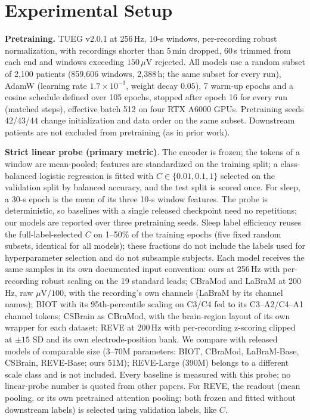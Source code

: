 \section{Experimental Setup}\label{sec:setup}
\noindent\textbf{Pretraining.} TUEG v2.0.1 at 256\,Hz, 10-s windows, per-recording robust
normalization, with recordings shorter than 5\,min dropped, 60\,s trimmed from each end and
windows exceeding $150\,\mu$V rejected. All models use a random subset of 2{,}100 patients
(859{,}606 windows, 2{,}388\,h; the same subset for every run), AdamW (learning rate
$1.7{\times}10^{-3}$, weight decay $0.05$), 7 warm-up epochs and a cosine schedule defined
over 105 epochs, stopped after epoch 16 for every run (matched steps), effective batch 512 on
four RTX A6000 GPUs. Pretraining seeds 42/43/44 change initialization and data order on the
same subset. Downstream patients are not excluded from pretraining (as in prior work).

\noindent\textbf{Strict linear probe (primary metric)}\label{sec:lpproto}. The encoder is
frozen; the tokens of a window are mean-pooled; features are standardized on the training
split; a class-balanced logistic regression is fitted with $C\in\{0.01,0.1,1\}$ selected on the
validation split by balanced accuracy, and the test split is scored once. For sleep, a 30-s
epoch is the mean of its three 10-s window features. The probe is deterministic, so baselines
with a single released checkpoint need no repetitions; our models are reported over three
pretraining seeds. Sleep label efficiency reuses the full-label-selected $C$ on 1--50\% of the
training epochs (five fixed random subsets, identical for all models); these fractions do not
include the labels used for hyperparameter selection and do not subsample subjects. Each model receives the same
samples in its own documented input convention: ours at 256\,Hz with per-recording robust
scaling on the 19 standard leads; CBraMod and LaBraM at 200\,Hz, raw $\mu$V$/100$, with the
recording's own channels (LaBraM by its channel names); BIOT with its 95th-percentile scaling
on C3/C4 fed to its C3--A2/C4--A1 channel tokens; CSBrain as CBraMod, with the brain-region
layout of its own wrapper for each dataset; REVE at 200\,Hz with per-recording z-scoring clipped
at ${\pm}15$ SD and its own electrode-position bank. We compare with released models of
comparable size (3--70M parameters: BIOT, CBraMod, LaBraM-Base, CSBrain, REVE-Base; ours 51M);
REVE-Large (390M) belongs to a different scale class and is not included. Every baseline is
measured with this probe; no linear-probe number is quoted from other papers. For REVE, the readout (mean pooling, or its own pretrained attention pooling; both
frozen and fitted without downstream labels) is selected using validation labels, like $C$.

